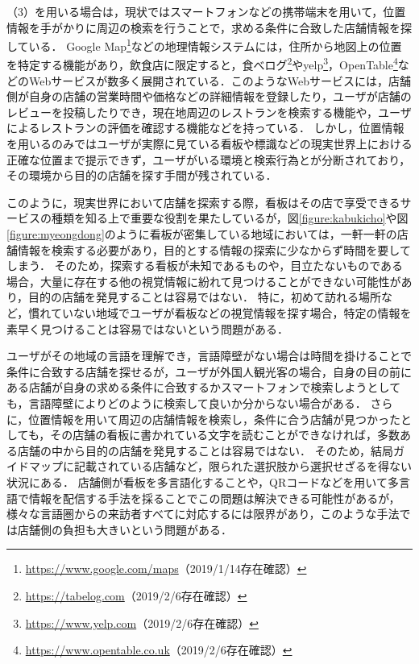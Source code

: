  （3）を用いる場合は，現状ではスマートフォンなどの携帯端末を用いて，位置情報を手がかりに周辺の検索を行うことで，求める条件に合致した店舗情報を探している．
  Google Map\footnote{\url{https://www.google.com/maps}（2019/1/14存在確認）}などの地理情報システムには，住所から地図上の位置を特定する機能があり，飲食店に限定すると，食べログ\footnote{\url{https://tabelog.com}（2019/2/6存在確認）}やyelp\footnote{\url{https://www.yelp.com}（2019/2/6存在確認）}，OpenTable\footnote{\url{https://www.opentable.co.uk}（2019/2/6存在確認）}などのWebサービスが数多く展開されている．このようなWebサービスには，店舗側が自身の店舗の営業時間や価格などの詳細情報を登録したり，ユーザが店舗のレビューを投稿したりでき，現在地周辺のレストランを検索する機能や，ユーザによるレストランの評価を確認する機能などを持っている．
  しかし，位置情報を用いるのみではユーザが実際に見ている看板や標識などの現実世界上における正確な位置まで提示できず，ユーザがいる環境と検索行為とが分断されており，その環境から目的の店舗を探す手間が残されている．
  
  このように，現実世界において店舗を探索する際，看板はその店で享受できるサービスの種類を知る上で重要な役割を果たしているが，図\ref{figure:kabukicho}や図\ref{figure:myeongdong}のように看板が密集している地域においては，一軒一軒の店舗情報を検索する必要があり，目的とする情報の探索に少なからず時間を要してしまう．
  そのため，探索する看板が未知であるものや，目立たないものである場合，大量に存在する他の視覚情報に紛れて見つけることができない可能性があり，目的の店舗を発見することは容易ではない．
  特に，初めて訪れる場所など，慣れていない地域でユーザが看板などの視覚情報を探す場合，特定の情報を素早く見つけることは容易ではないという問題がある．

  ユーザがその地域の言語を理解でき，言語障壁がない場合は時間を掛けることで条件に合致する店舗を探せるが，ユーザが外国人観光客の場合，自身の目の前にある店舗が自身の求める条件に合致するかスマートフォンで検索しようとしても，言語障壁によりどのように検索して良いか分からない場合がある．
  さらに，位置情報を用いて周辺の店舗情報を検索し，条件に合う店舗が見つかったとしても，その店舗の看板に書かれている文字を読むことができなければ，多数ある店舗の中から目的の店舗を発見することは容易ではない．
  そのため，結局ガイドマップに記載されている店舗など，限られた選択肢から選択せざるを得ない状況にある．
  店舗側が看板を多言語化することや，QRコードなどを用いて多言語で情報を配信する手法を採ることでこの問題は解決できる可能性があるが，様々な言語圏からの来訪者すべてに対応するには限界があり，このような手法では店舗側の負担も大きいという問題がある．

